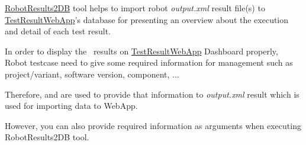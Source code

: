 



\href{https://github.com/test-fullautomation/robotframework-testresultwebapptool}{RobotResults2DB}
tool helps to import robot \emph{output.xml} result file(s) to
\href{https://github.com/test-fullautomation/testresultwebapp}{TestResultWebApp}'s
database for presenting an overview about the execution and detail of
each test result.

In order to display the \rfwcore\ results on
\href{https://github.com/test-fullautomation/testresultwebapp}{TestResultWebApp}
Dashboard properly, Robot testcase need to give some required
information for management such as project/variant, software version,
component, ...

Therefore,  and \rcode{[Tags]} are used to provide
that information to \emph{output.xml} result which is used for importing
data to WebApp.

However, you can also provide required information as arguments when executing
RobotResults2DB tool.
